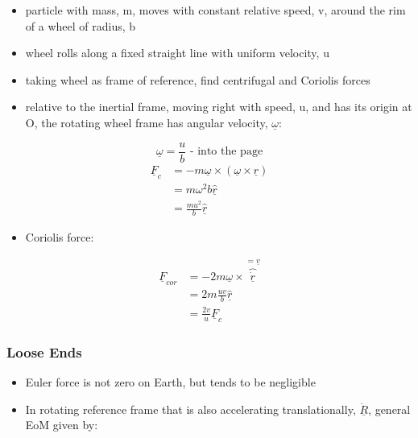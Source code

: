 \documentclass[a4paper,11pt,normalem]{article}
\begin{document}
\begin{example}
\begin{itemize}
\item
  particle with mass, m, moves with constant relative speed, v, around
  the rim of a wheel of radius, b
\item
  wheel rolls along a fixed straight line with uniform velocity, u
\item
  taking wheel as frame of reference, find centrifugal and Coriolis
  forces
\item
  relative to the inertial frame, moving right with speed, u, and has
  its origin at O, the rotating wheel frame has angular velocity,
  \(\underline{\omega}\):
\end{itemize}

\[
    \underline{\omega} = \frac{u}{b} \text{ - into the page} \] \[
    \begin{aligned}
    \underline{F}_c &= -m\underline{\omega} \times (\underline{\omega} \times \underline{r}) \\
    &= m\omega^2b \underline{\hat{r}} \\
    &= \frac{mu^2}{b}\underline{\hat{r}}
    \end{aligned}
\]

\begin{itemize}
\item
  Coriolis force:
\end{itemize}

\[
    \begin{aligned}
    \underline{F}_{cor} &= -2m\underline{\omega} \times \overbrace{\underline{\dot{r}}}^{= \underline{v}} \\
    &= 2m\frac{uv}{b}\underline{\hat{r}} \\
    &= \frac{2v}{u}\underline{F}_c
    \end{aligned}
\]
\end{example}

\subsubsection{Loose Ends}\label{loose-ends}

\begin{itemize}
\item
  Euler force is not zero on Earth, but tends to be negligible
\item
  In rotating reference frame that is also accelerating translationally,
  \(\underline{\ddot{R}}\), general EoM given by:
\end{itemize}
\end{document}
